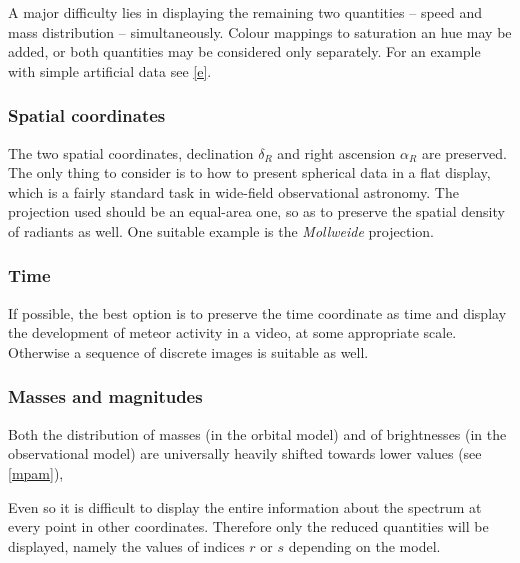         A major difficulty lies in displaying the remaining two quantities -- speed and mass distribution -- simultaneously.
        Colour mappings to saturation an hue may be added, or both quantities may be considered only separately.
        For an example with simple artificial data see \cref{e}.

        \subsubsection{Spatial coordinates} \label{iovs}
            The two spatial coordinates, declination $\delta_R$ and right ascension $\alpha_R$ are preserved.
            The only thing to consider is to how to present spherical data in a flat display,
            which is a fairly standard task in wide-field observational astronomy.
            The projection used should be an equal-area one, so as to preserve the spatial density of radiants as well.
            One suitable example is the \emph{Mollweide} projection.


        \subsubsection{Time} \label{iovt}
            If possible, the best option is to preserve the time coordinate as time
            and display the development of meteor activity in a video, at some appropriate scale.
            Otherwise a sequence of discrete images is suitable as well.

        \subsubsection{Masses and magnitudes} \label{iovm}
            Both the distribution of masses (in the orbital model) and of brightnesses (in the observational model)
            are universally heavily shifted towards lower values (see \cref{mpam}),

            Even so it is difficult to display the entire information about the spectrum at every point
            in other coordinates. Therefore only the reduced quantities will be displayed,
            namely the values of indices $r$ or $s$ depending on the model.

